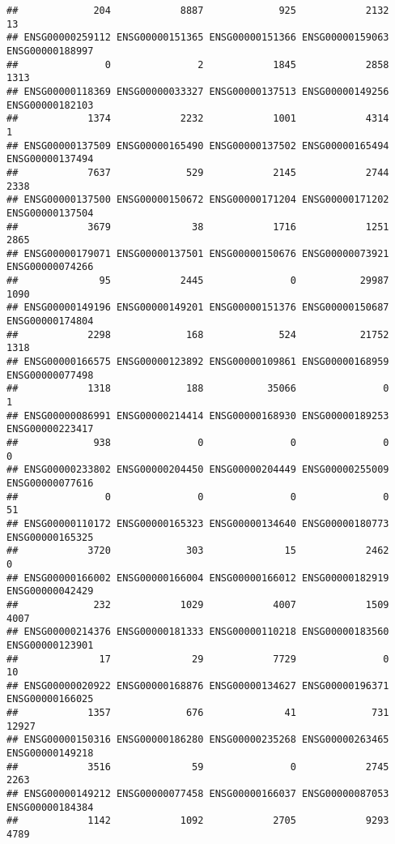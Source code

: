 \documentclass[
]{article}
\begin{document}
\begin{verbatim}
##             204            8887             925            2132              13 
## ENSG00000259112 ENSG00000151365 ENSG00000151366 ENSG00000159063 ENSG00000188997 
##               0               2            1845            2858            1313 
## ENSG00000118369 ENSG00000033327 ENSG00000137513 ENSG00000149256 ENSG00000182103 
##            1374            2232            1001            4314               1 
## ENSG00000137509 ENSG00000165490 ENSG00000137502 ENSG00000165494 ENSG00000137494 
##            7637             529            2145            2744            2338 
## ENSG00000137500 ENSG00000150672 ENSG00000171204 ENSG00000171202 ENSG00000137504 
##            3679              38            1716            1251            2865 
## ENSG00000179071 ENSG00000137501 ENSG00000150676 ENSG00000073921 ENSG00000074266 
##              95            2445               0           29987            1090 
## ENSG00000149196 ENSG00000149201 ENSG00000151376 ENSG00000150687 ENSG00000174804 
##            2298             168             524           21752            1318 
## ENSG00000166575 ENSG00000123892 ENSG00000109861 ENSG00000168959 ENSG00000077498 
##            1318             188           35066               0               1 
## ENSG00000086991 ENSG00000214414 ENSG00000168930 ENSG00000189253 ENSG00000223417 
##             938               0               0               0               0 
## ENSG00000233802 ENSG00000204450 ENSG00000204449 ENSG00000255009 ENSG00000077616 
##               0               0               0               0              51 
## ENSG00000110172 ENSG00000165323 ENSG00000134640 ENSG00000180773 ENSG00000165325 
##            3720             303              15            2462               0 
## ENSG00000166002 ENSG00000166004 ENSG00000166012 ENSG00000182919 ENSG00000042429 
##             232            1029            4007            1509            4007 
## ENSG00000214376 ENSG00000181333 ENSG00000110218 ENSG00000183560 ENSG00000123901 
##              17              29            7729               0              10 
## ENSG00000020922 ENSG00000168876 ENSG00000134627 ENSG00000196371 ENSG00000166025 
##            1357             676              41             731           12927 
## ENSG00000150316 ENSG00000186280 ENSG00000235268 ENSG00000263465 ENSG00000149218 
##            3516              59               0            2745            2263 
## ENSG00000149212 ENSG00000077458 ENSG00000166037 ENSG00000087053 ENSG00000184384 
##            1142            1092            2705            9293            4789 

\end{verbatim}
\end{document}
